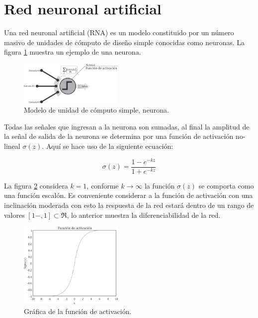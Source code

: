 \section{Red neuronal artificial}
Una red neuronal artificial (RNA) es un modelo constituido por un
n\'umero masivo de unidades de c\'omputo de dise\~no simple
conocidas como neuronas. La figura \ref{fig:neuron}  muestra un ejemplo
de una neurona.

\begin{figure}[H]
	\centering
	\includegraphics[width=5cm]{img/fig_neuron.png}
	\caption{Modelo de unidad de c\'omputo simple, neurona.}
	\label{fig:neuron}
\end{figure}

Todas las se\~nales que ingresan a la neurona son sumadas,
al final la amplitud de la se\~nal de salida de la neurona se
determina por una funci\'on de activaci\'on no-lineal $\sigma(z)$. Aqu\'i
se hace uso de la siguiente ecuaci\'on: 

\begin{equation}
	\sigma(z)=\frac{1-e^{-kz}}{1+e^{-kz}}
\end{equation}

La figura \ref{fig:activationFunc} considera $k=1$, conforme $k\rightarrow\infty$ la funci\'on
$\sigma(z)$ se comporta como una funci\'on escal\'on. Es conveniente
considerar a la funci\'on de activaci\'on con una inclinaci\'on
moderada con esto la respuesta de la red estar\'a dentro de un
rango de valores $\left[1-,1\right]\subset\Re$, lo anterior muestra la diferenciabilidad
de la red.

\begin{figure}[H]
	\centering
	\includegraphics[width=5cm]{img/fig_activationFunction.png}
	\caption{Gr\'afica de  la funci\'on de activaci\'on.}
	\label{fig:activationFunc}
\end{figure}

